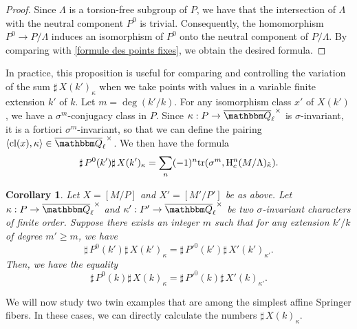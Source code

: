 \documentclass[12pt,english]{smfart}
\numberwithin{equation}{subsection}
\newtheorem{corollaire}[equation]{Corollary}
\theoremstyle{remark}
\newcommand\QQ{{\mathbbm Q}}
\newcommand\rmH{{\rm H}}
\newcommand\tr{{\rm tr}}
\newcommand\cl{{\rm cl}}
\newcommand\Ql{{\overline\QQ_\ell}}
\begin{document}
\begin{proof}
Since $\Lambda$ is a torsion-free subgroup of $P$, we have that
the intersection of $\Lambda$ with the neutral component $P^0$ is trivial.
Consequently, the homomorphism $P^0 \rightarrow P/ \Lambda$ induces an
isomorphism of $P^0$ onto the neutral component of $P/ \Lambda$. By
comparing with \ref{formule des points fixes}, we obtain the desired formula.
\end{proof}

In practice, this proposition is useful for comparing and controlling
the variation of the sum ${\sharp\,} X(k')_\kappa$ when we take points
with values in a variable finite extension $k'$ of $k$. Let $m=\deg(k'/
k)$. For any isomorphism class $x'$ of $X(k')$, we have a $\sigma^m$-conjugacy class in $P$. Since $\kappa:P\rightarrow
\Ql^\times$ is $\sigma$-invariant, it is a fortiori
$\sigma^m$-invariant, so that we can define the pairing $\langle
\cl(x),\kappa \rangle \in \Ql^\times$. We then have the formula
$$ {\sharp\,} P^0(k') {\sharp\,} X(k')_\kappa =\sum_n (-1)^n \tr(\sigma^m, \rmH^n_c(M/
\Lambda)_{\tilde\kappa}).
$$


\begin{corollaire}\label{k'->k}
Let $X=[M/ P]$ and $X'=[M'/ P']$ be as above. Let $\kappa:P
\rightarrow \Ql^\times$ and $\kappa':P' \rightarrow \Ql^\times$ be two
$\sigma$-invariant characters of finite order. Suppose there exists an
integer $m$ such that for any extension $k'/ k$ of degree $m'\geq m$, we have
$${\sharp\,} P^0(k') {\sharp\,} X(k')_\kappa= {\sharp\,} {P'}^0(k') {\sharp\,}
X'(k')_{\kappa'}.$$ Then, we have the equality
$${\sharp\,} P^0(k) {\sharp\,} X(k)_\kappa= {\sharp\,} {P'}^0(k) {\sharp\,} X'(k)_{\kappa'}.$$
\end{corollaire}

We will now study two twin examples that are among the
simplest affine Springer fibers. In these cases, we can directly
calculate the numbers ${\sharp\,} X(k)_\kappa$.
\end{document}
